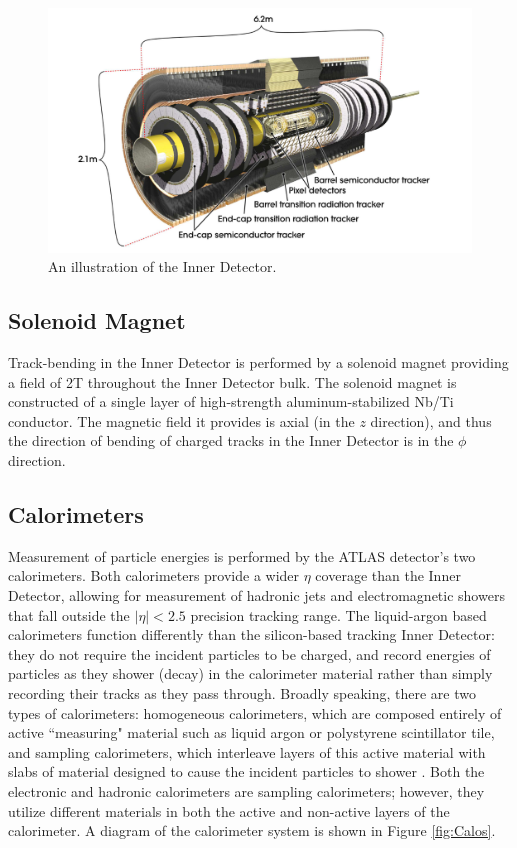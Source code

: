 \begin{figure}
  \includegraphics[width=\linewidth]{figures/detector_chapter/ID.png}
  \caption{An illustration of the Inner Detector. \cite{ATLAS_Jinst}}
  \label{fig:ID}
\end{figure}

\subsection{Solenoid Magnet} \label{sec:solenoid}

Track-bending in the Inner Detector is performed by a solenoid magnet providing a field of 2T throughout the Inner Detector bulk. The solenoid magnet is constructed of a single layer of high-strength aluminum-stabilized Nb/Ti conductor. The magnetic field it provides is axial (in the $z$ direction), and thus the direction of bending of charged tracks in the Inner Detector is in the $\phi$ direction. 

\subsection{Calorimeters} \label{sec:Calos} 

Measurement of particle energies is performed by the ATLAS detector's two calorimeters. Both calorimeters provide a wider $\eta$ coverage than the Inner Detector, allowing for measurement of hadronic jets and electromagnetic showers that fall outside the $|\eta| < 2.5$ precision tracking range. The liquid-argon based calorimeters function differently than the silicon-based tracking Inner Detector: they do not require the incident particles to be charged, and record energies of particles as they shower (decay) in the calorimeter material rather than simply recording their tracks as they pass through. Broadly speaking, there are two types of calorimeters: homogeneous calorimeters, which are composed entirely of active ``measuring" material such as liquid argon or polystyrene scintillator tile, and sampling calorimeters, which interleave layers of this active material with slabs of material designed to cause the incident particles to shower \cite{misconceptions}. Both the electronic and hadronic calorimeters are sampling calorimeters; however, they utilize different materials in both the active and non-active layers of the calorimeter. A diagram of the calorimeter system is shown in Figure \ref{fig:Calos}.

